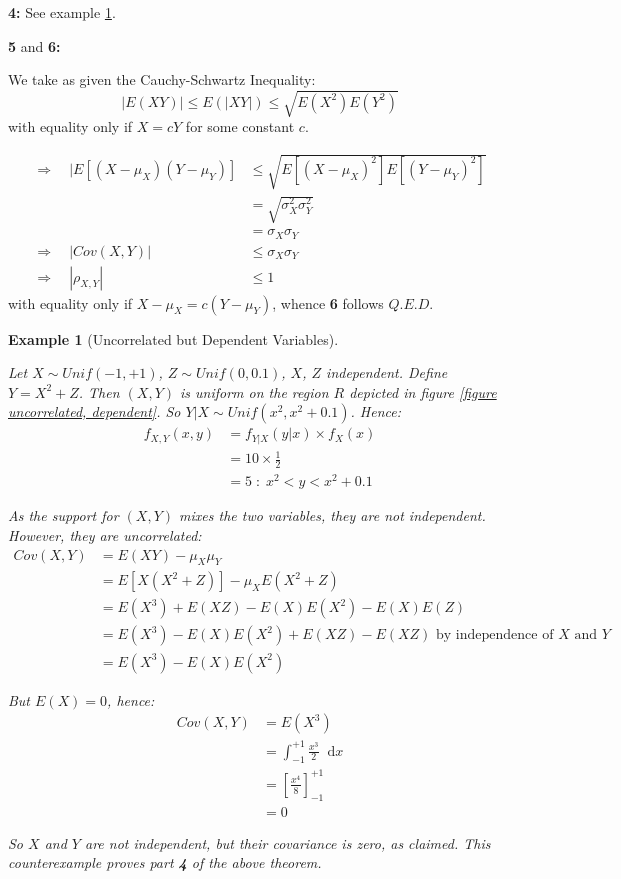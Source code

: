 \documentclass[12pt,a4paper]{article}
\newtheorem{ex}[thm]{Example}
\newcommand{\diff}{\;\mathrm{d}}
\begin{document}
\noindent\textbf{4: } See example \ref{uncorrelated, dependent}.

\noindent\textbf{5} and \textbf{6: }

\noindent We take as given the Cauchy-Schwartz Inequality:
$$|E(XY)| \leq E(|XY|) \leq \sqrt{E(X^2)E(Y^2)}$$
with equality only if $X = cY$ for some constant $c$.

\begin{align*}
\Rightarrow\quad |E[(X-\mu_X)(Y-\mu_Y)] &\leq \sqrt{E[(X-\mu_X)^2]E[(Y-\mu_Y)^2]}\\
&= \sqrt{\sigma_X^2\sigma_Y^2}\\
&= \sigma_X\sigma_Y\\
\Rightarrow \quad |Cov(X,Y)| &\leq \sigma_X\sigma_Y\\
\Rightarrow\quad |\rho_{X,Y}| &\leq 1
\end{align*}
with equality only if $X-\mu_X = c(Y-\mu_Y)$, whence \textbf{6} follows \hfill$Q.E.D.$

\begin{ex}[Uncorrelated but Dependent Variables]\label{uncorrelated, dependent}$\;$\par\vspace{1cm}

Let $X \sim Unif(-1,+1)$, $Z \sim Unif(0,0.1)$, $X$, $Z$ independent. Define $Y=X^2 + Z$. Then $(X,Y)$ is uniform on the region $R$ depicted in figure \ref{figure uncorrelated, dependent}. So $Y|X \sim Unif(x^2,x^2+0.1)$. Hence:
\begin{align*}
f_{X,Y}(x,y) &= f_{Y|X}(y|x) \times f_X(x)\\
&= 10 \times \frac{1}{2}\\
&= 5 \; : \; x^2 < y < x^2 + 0.1
\end{align*}

As the support for $(X,Y)$ mixes the two variables, they are not independent. However, they are uncorrelated:
\begin{align*}
Cov(X,Y) &= E(XY) - \mu_X\mu_Y\\
&= E[X(X^2+Z)] - \mu_XE(X^2+Z)\\
&= E(X^3) + E(XZ) - E(X)E(X^2) - E(X)E(Z)\\
&= E(X^3)-E(X)E(X^2) + E(XZ) - E(XZ) \mbox{ by independence of $X$ and $Y$}\\
&=E(X^3)-E(X)E(X^2)
\end{align*}

But $E(X) = 0$, hence:
\begin{align*}
Cov(X,Y) &= E(X^3)\\
&= \int_{-1}^{+1}\!\! \frac{x^3}{2}\;\diff x\\
&= \left[\frac{x^4}{8}\right]_{-1}^{+1}\\
&= 0
\end{align*}

So $X$ and $Y$ are not independent, but their covariance is zero, as claimed. This counterexample proves part \textbf{4} of the above theorem.
\end{ex}
\end{document}

